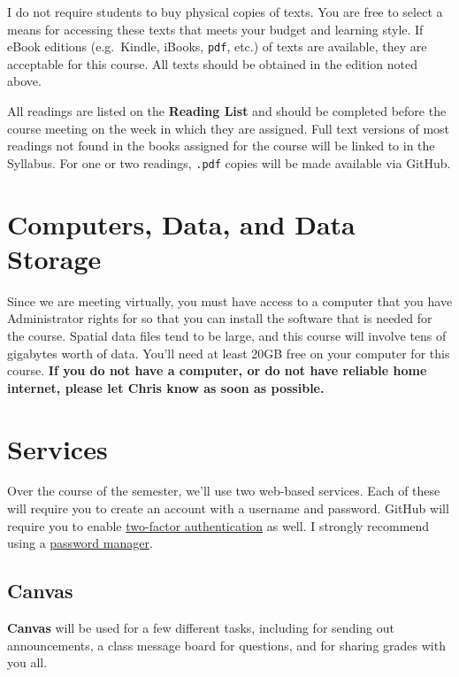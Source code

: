\documentclass[
]{book}
\begin{document}
I do not require students to buy physical copies of texts. You are free to select a means for accessing these texts that meets your budget and learning style. If eBook editions (e.g.~Kindle, iBooks, \texttt{pdf}, etc.) of texts are available, they are acceptable for this course. All texts should be obtained in the edition noted above.

All readings are listed on the \textbf{Reading List} and should be completed before the course meeting on the week in which they are assigned. Full text versions of most readings not found in the books assigned for the course will be linked to in the Syllabus. For one or two readings, \texttt{.pdf} copies will be made available via GitHub.

\hypertarget{computers-data-and-data-storage}{%
\section{Computers, Data, and Data Storage}\label{computers-data-and-data-storage}}

Since we are meeting virtually, you must have access to a computer that you have Administrator rights for so that you can install the software that is needed for the course. Spatial data files tend to be large, and this course will involve tens of gigabytes worth of data. You'll need at least 20GB free on your computer for this course. \textbf{If you do not have a computer, or do not have reliable home internet, please let Chris know as soon as possible.}

\hypertarget{services}{%
\section{Services}\label{services}}

Over the course of the semester, we'll use two web-based services. Each of these will require you to create an account with a username and password. GitHub will require you to enable \href{https://en.wikipedia.org/wiki/Multi-factor_authentication}{two-factor authentication} as well. I strongly recommend using a \href{https://lifehacker.com/5529133/five-best-password-managers}{password manager}.

\hypertarget{canvas}{%
\subsection{Canvas}\label{canvas}}

\textbf{Canvas} will be used for a few different tasks, including for sending out announcements, a class message board for questions, and for sharing grades with you all.
\end{document}
